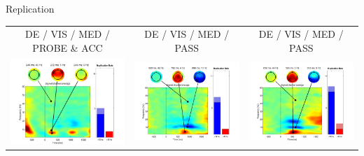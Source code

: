 \documentclass[final]{beamer}
\begin{document}
\begin{frame}{}
\begin{textblock}{67}
\begin{block}{Replication}
\begin{tabular}{c c c}
DE / VIS / MED / PROBE \& ACC  & DE / VIS / MED / PASS & DE / VIS / MED / PASS \\
\includegraphics{gamma07} & \includegraphics{gamma08} & \includegraphics{gamma09} \\

\end{tabular}
\end{block}
\end{textblock}
\end{frame}
\end{document}
